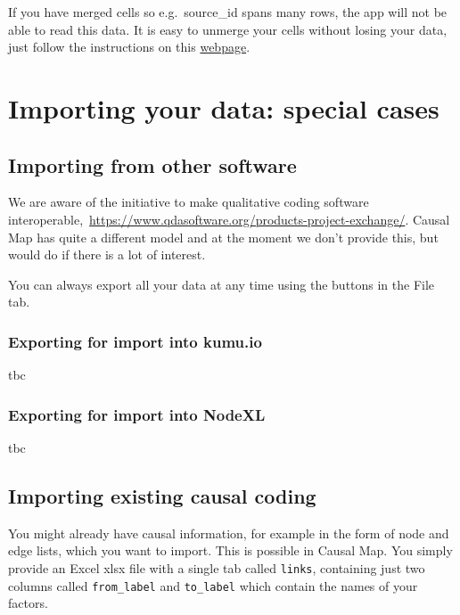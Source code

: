 \documentclass[
]{book}
\begin{document}
If you have merged cells so e.g.~source\_id spans many rows, the app will not be able to read this data. It is easy to unmerge your cells without losing your data, just follow the instructions on this \href{https://www.extendoffice.com/documents/excel/1139-excel-unmerge-cells-and-fill.html}{webpage}.

\hypertarget{importing-your-data-special-cases}{%
\chapter{Importing your data: special cases}\label{importing-your-data-special-cases}}

\hypertarget{importing-from-other-software}{%
\section{Importing from other software}\label{importing-from-other-software}}

We are aware of the initiative to make qualitative coding software interoperable,~\url{https://www.qdasoftware.org/products-project-exchange/}. Causal Map has quite a different model and at the moment we don't provide this, but would do if there is a lot of interest.

You can always export all your data at any time using the buttons in the File tab.

\hypertarget{exporting-for-import-into-kumu.io}{%
\subsection{Exporting for import into kumu.io}\label{exporting-for-import-into-kumu.io}}

tbc

\hypertarget{exporting-for-import-into-nodexl}{%
\subsection{Exporting for import into NodeXL}\label{exporting-for-import-into-nodexl}}

tbc

\hypertarget{importing-existing-causal-coding}{%
\section{Importing existing causal coding}\label{importing-existing-causal-coding}}

You might already have causal information, for example in the form of node and edge lists, which you want to import. This is possible in Causal Map. You simply provide an Excel xlsx file with a single tab called \texttt{links}, containing just two columns called \texttt{from\_label} and \texttt{to\_label} which contain the names of your factors.
\end{document}
